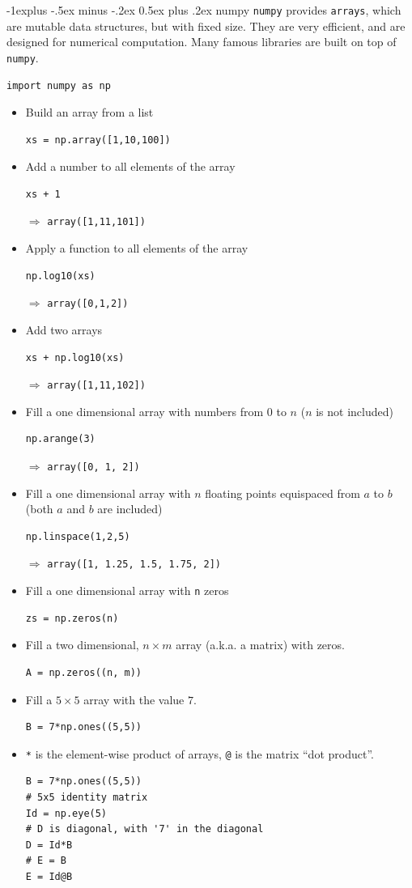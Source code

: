 \documentclass[10pt,landscape]{article}
\makeatletter
\renewcommand{\subsection}{\@startsection{subsection}{2}{0mm}%
                                {-1explus -.5ex minus -.2ex}%
                                {0.5ex plus .2ex}%
                                {\normalfont\normalsize\bfseries}}
\makeatother
\begin{document}
\begin{multicols*}{3}
\subsection{numpy}
\texttt{numpy} provides \texttt{arrays}, which are mutable data structures, but with fixed size.
They are very efficient, and are designed for numerical computation.
Many famous libraries are built on top of \texttt{numpy}.
\begin{verbatim}
import numpy as np
\end{verbatim}
\begin{itemize}
  \item Build an array from a list
\begin{verbatim}
xs = np.array([1,10,100])
\end{verbatim}
\item Add a number to all elements of the array
\begin{verbatim}
xs + 1
\end{verbatim}
$\Rightarrow$ \texttt{array([1,11,101])}
\item Apply a function to all elements of the array
\begin{verbatim}
np.log10(xs)
\end{verbatim}
$\Rightarrow$ \texttt{array([0,1,2])}
\item Add two arrays
\begin{verbatim}
xs + np.log10(xs)
\end{verbatim}
$\Rightarrow$ \texttt{array([1,11,102])}
\item Fill a one dimensional array with numbers from $0$ to $n$ ($n$ is not included)
\begin{verbatim}
np.arange(3)
\end{verbatim}
$\Rightarrow$ \texttt{array([0, 1, 2])}
\item Fill a one dimensional array with $n$ floating points equispaced from $a$ to $b$ (both $a$ and $b$ are included)
\begin{verbatim}
np.linspace(1,2,5)
\end{verbatim}
$\Rightarrow$ \texttt{array([1, 1.25, 1.5, 1.75, 2])}
\item Fill a one dimensional array with \texttt{n} zeros
\begin{verbatim}
zs = np.zeros(n)
\end{verbatim}
  \item Fill a two dimensional, $n\times m$ array (a.k.a. a matrix) with zeros.
  \begin{verbatim}
A = np.zeros((n, m))
\end{verbatim}
  \item Fill a $5\times 5$ array with the value $7$.
\begin{verbatim}
B = 7*np.ones((5,5))
\end{verbatim}
  \item \texttt{*} is the element-wise product of arrays, \texttt{@} is the matrix ``dot product''.
  \begin{verbatim}
B = 7*np.ones((5,5))
# 5x5 identity matrix
Id = np.eye(5)
# D is diagonal, with '7' in the diagonal
D = Id*B
# E = B
E = Id@B
\end{verbatim}


\end{itemize}
\end{multicols*}
\end{document}
